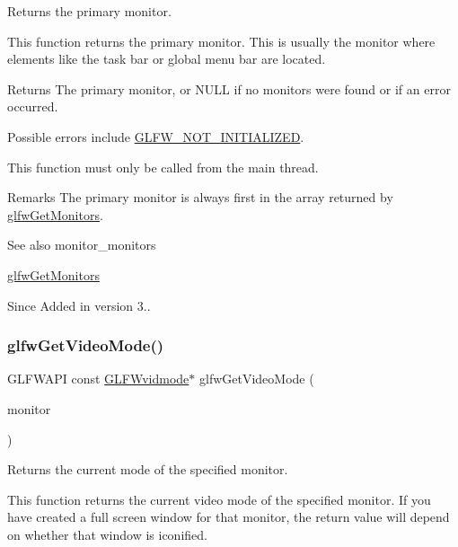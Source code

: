 Returns the primary monitor. 

This function returns the primary monitor. This is usually the monitor where elements like the task bar or global menu bar are located.

\begin{DoxyReturn}{Returns}
The primary monitor, or {\ttfamily N\+U\+LL} if no monitors were found or if an error occurred.
\end{DoxyReturn}
Possible errors include \hyperlink{group__errors_ga2374ee02c177f12e1fa76ff3ed15e14a}{G\+L\+F\+W\+\_\+\+N\+O\+T\+\_\+\+I\+N\+I\+T\+I\+A\+L\+I\+Z\+ED}.

This function must only be called from the main thread.

\begin{DoxyRemark}{Remarks}
The primary monitor is always first in the array returned by \hyperlink{group__monitor_gab4d483284c57e28837bc2cd9639e9665}{glfw\+Get\+Monitors}.
\end{DoxyRemark}
\begin{DoxySeeAlso}{See also}
monitor\+\_\+monitors 

\hyperlink{group__monitor_gab4d483284c57e28837bc2cd9639e9665}{glfw\+Get\+Monitors}
\end{DoxySeeAlso}
\begin{DoxySince}{Since}
Added in version 3.. 
\end{DoxySince}
\mbox{\label{group__monitor_gac234b63ec525c70d7e18ac84aca088c6}} 
\subsubsection{\texorpdfstring{glfw\+Get\+Video\+Mode()}{glfwGetVideoMode()}}
{\footnotesize\ttfamily G\+L\+F\+W\+A\+PI const \hyperlink{struct_g_l_f_wvidmode}{G\+L\+F\+Wvidmode}$\ast$ glfw\+Get\+Video\+Mode (\begin{DoxyParamCaption}\item[{\hyperlink{group__monitor_ga8d9efd1cde9426692c73fe40437d0ae3}{G\+L\+F\+Wmonitor} $\ast$}]{monitor }\end{DoxyParamCaption})}



Returns the current mode of the specified monitor. 

This function returns the current video mode of the specified monitor. If you have created a full screen window for that monitor, the return value will depend on whether that window is iconified.


